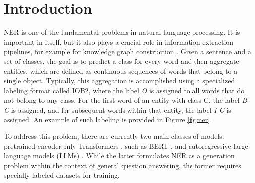 \chapter{Introduction}
\label{sec:introduction}
\ac{NER} is one of the fundamental problems in natural language processing. It is important in
itself, but it also plays a crucial role in information extraction pipelines, for example for knowledge
graph construction \cite{weikum2021machine, zhang-etal-2022-efficient-robust}. Given a sentence and a set of classes, the goal is to predict a class for every
word and then aggregate entities, which are defined as continuous sequences of words that belong to
a single object. Typically, this aggregation is accomplished using a specialized labeling format
called IOB2, where the label \textit{O} is assigned to all words that do not belong to any class.
For the first word of an entity with class C, the label \textit{B-C} is assigned, and for subsequent
words within that entity, the label \textit{I-C} is assigned. An example of such labeling is
provided in Figure \ref{fig:ner}.

\begin{figure*}[ht]
  \centering
  \caption{Example of NER labeling in IOB2 format}
  \label{fig:ner}
\end{figure*}

To address this problem, there are currently two main classes of models: pretrained encoder-only
Transformers \cite{vaswani2017attention}, such as BERT \cite{devlin-etal-2019-bert}, and autoregressive
large language models (LLMs) \cite{gpt3, zhou2023universalner}. While the latter formulates NER as a
generation problem within the context of general question answering, the former requires specially
labeled datasets for training.

